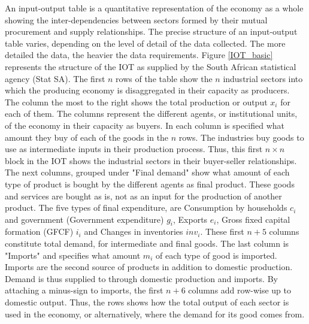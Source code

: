 \documentclass[12pt,english]{article}
\begin{document}
An input-output table is a quantitative representation of the economy as a whole showing the inter-dependencies between sectors formed by their mutual procurement and supply relationships. %
The precise structure of an input-output table varies, %
depending on the level of detail of the data collected. The more detailed the data, the heavier the data requirements. %
Figure \ref{IOT_basic} represents the structure of the IOT as supplied by the South African statistical agency (Stat SA). The first $n$ rows of the table show the $n$ industrial sectors into which the producing economy is disaggregated in their capacity as producers. The column the most to the right shows the total production or output $x_i$ for each of them. The columns represent the different agents, or institutional units, of the economy in their capacity as buyers. In each column is specified what amount they buy of each of the goods in the $n$ rows. %
The industries buy goods to use as intermediate inputs in their production process. Thus, this first $n \times n$ block in the IOT shows the industrial sectors in their buyer-seller relationships. The next columns, grouped under "Final demand" show what amount of each type of product is bought by the different agents as final product. These goods and services are bought as is, not as an input for the production of another product. The five types of final expenditure, are Consumption by households $c_i$ and government (Government expenditure) $g_i$, Exports $e_i$, Gross fixed capital formation (GFCF) $i_i$ and Changes in inventories $inv_i$. These first $n+5$ columns constitute total demand, for intermediate and final goods. The last column is "Imports" and specifies what amount $m_i$ of each type of good is imported. Imports are the second source of products in addition to domestic production. Demand is thus supplied to through domestic production and imports. By attaching a minus-sign to imports, the first $n+6$ columns add row-wise up to domestic output. Thus, the rows shows how the total output of each sector is used in the economy, or alternatively, where the demand for its good comes from.
\end{document}
